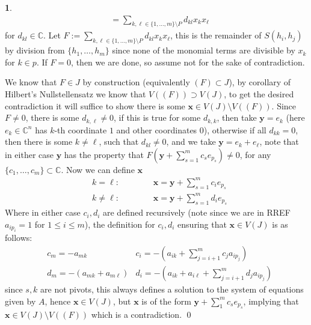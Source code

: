 \documentclass[11pt]{article}
\theoremstyle{definition}
\newtheorem{pb}{}
\newcommand{\set}[1]{\{#1\}}
\begin{document}
\begin{pb}
\begin{align*}
            &= \sum_{k,\ell \in \set{1,\hdots,m}\setminus P} d_{kl}x_kx_\ell
        \end{align*}
        for \(d_{kl} \in \mathbb{C}\). Let \(F := \sum_{k,\ell \in \set{1,\hdots,m}\setminus P} d_{kl}x_kx_\ell\), this is the remainder of \(S(h_i,h_j)\) by division from \(\set{h_1,\hdots,h_m}\) since none of the monomial terms are divisible by \(x_k\) for \(k \in p\). If \(F = 0\), then we are done, so assume not for the sake of contradiction.

        We know that \(F \in J\) by construction (equivalently \((F) \subset J\)), by corollary of Hilbert's Nullstellensatz we know that \(V((F)) \supset V(J)\), to get the desired contradiction it will suffice to show there is some \(\mathbf{x} \in V(J) \setminus V((F))\). Since \(F \neq 0\), there is some \(d_{k,\ell} \neq 0\), if this is true for some \(d_{k,k}\), then take \(\mathbf{y} = e_k\) (here \(e_k \in \mathbb{C}^n\) has \(k\)-th coordinate \(1\) and other coordinates \(0\)), otherwise if all \(d_{kk} = 0\), then there is some \(k \neq \ell\), such that \(d_{kl} \neq 0\), and we take \(\mathbf{y} = e_k + e_\ell\), note that in either case \(\mathbf{y}\) has the property that \(F(\mathbf{y} + \sum_{s=1}^m c_se_{p_s}) \neq 0\), for any \(\set{c_1,\hdots,c_m} \subset \mathbb{C}\). Now we can define \(\mathbf{x}\)
        \begin{align*}
            &k = \ell: \quad\quad\quad\quad \mathbf{x} = \mathbf{y} + \sum_{s = 1}^m c_i e_{p_s} \\
            &k \neq \ell: \quad\quad\quad\quad \mathbf{x} = \mathbf{y} + \sum_{s = 1}^m d_i e_{p_s}
        \end{align*}
        Where in either case \(c_i, d_i\) are defined recursively (note since we are in RREF \(a_{ip_i} = 1\) for \(1 \leq i \leq m\)), the definition for \(c_i, d_i\) ensuring that \(\mathbf{x} \in V(J)\) is as follows:
        \begin{align*}
            &c_m = -a_{mk} &c_i = -\left(a_{ik} + \sum_{j = i+1}^m c_j a_{ip_j}\right)\\
            &d_m = -(a_{mk} + a_{m\ell}) & d_i = -\left(a_{ik}+a_{i\ell} + \sum_{j = i+1}^m d_ja_{ip_j}\right)
        \end{align*}
        since \(s,k\) are not pivots, this always defines a solution to the system of equations given by \(A\), hence \(\mathbf{x} \in V(J)\), but \(\mathbf{x}\) is of the form \(\mathbf{y} + \sum_1^m c_s e_{p_s}\), implying that \(\mathbf{x} \in V(J) \setminus V((F))\) which is a contradiction. \qed
    \end{pb}
\end{document}
